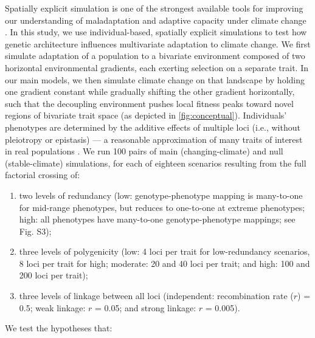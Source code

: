 \documentclass[9pt,twocolumn,twoside,lineno]{pnas-new}
\begin{document}
Spatially explicit simulation is one of the strongest available tools
for improving our understanding of maladaptation and adaptive capacity
under climate change \cite{capblancq_review}.
In this study, we use individual-based, spatially explicit simulations
to test how genetic architecture influences multivariate adaptation to climate change.
We first simulate 
adaptation of a population to a bivariate environment composed of two horizontal 
environmental gradients, each exerting selection on a separate trait.
In our main models, we then simulate climate change on that landscape by holding one gradient 
constant while gradually shifting the other gradient horizontally, such that
the decoupling environment pushes local fitness peaks toward novel regions 
of bivariate trait space (as depicted in \ref{fig:conceptual}).
Individuals' phenotypes are determined by the additive effects of multiple loci
(i.e., without pleiotropy or epistasis) ---
a reasonable approximation of many traits of interest in real populations \cite{sella}.
We run 100 pairs of main (changing-climate)
and null (stable-climate) simulations, for each of eighteen scenarios
resulting from the full factorial crossing of:
\begin{enumerate}
    \item two levels of redundancy (low: genotype-phenotype mapping is many-to-one for mid-range phenotypes, but reduces to one-to-one at extreme phenotypes; high: all phenotypes have many-to-one genotype-phenotype mappings; see Fig. S3); 
    \item three levels of polygenicity (low: 4 loci per trait for low-redundancy scenarios, 8 loci per trait for high; moderate: 20 and 40 loci per trait; and high: 100 and 200 loci per trait);
    \item three levels of linkage between all loci (independent: recombination rate ($r$) = 0.5; weak linkage: $r$ = 0.05; and strong linkage: $r$ = 0.005).
\end{enumerate}
We test the hypotheses that:
\end{document}
